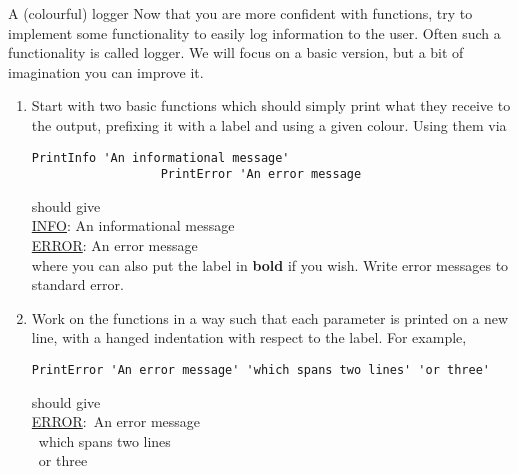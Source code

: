 
\begin{exercise}[Inspirational]{A (colourful) logger}
    Now that you are more confident with functions, try to implement some functionality to easily log information to the user.
    Often such a functionality is called logger.
    We will focus on a basic version, but a bit of imagination you can improve it.
    \begin{enumerate}
        \item Start with two basic functions which should simply print what they receive to the output, prefixing it with a label and using a given colour.
              Using them via
              \begin{lstlisting}[style=MyBash]
                  PrintInfo 'An informational message'
                  PrintError 'An error message
              \end{lstlisting}
              should give\\[0.3ex]
              {
                \ttfamily
                \hspace*{5mm}\color{ForestGreen}\underline{INFO}: An informational message\\
                \hspace*{5mm}\color{red}\underline{ERROR}: An error message\\[0.5ex]
              }
              where you can also put the label in \textbf{bold} if you wish.
              Write error messages to standard error.
        \item Work on the functions in a way such that each parameter is printed on a new line, with a hanged indentation with respect to the label.
              For example, 
              \begin{lstlisting}[style=MyBash]
                  PrintError 'An error message' 'which spans two lines' 'or three'
              \end{lstlisting}
              should give\\[0.3ex]
              {
                \ttfamily\color{red}
                \hspace*{5mm}\underline{ERROR}:~An error message\\
                \hspace*{5mm}~which spans two lines\\
                \hspace*{5mm}~or three
}
\end{enumerate}
\end{exercise}
